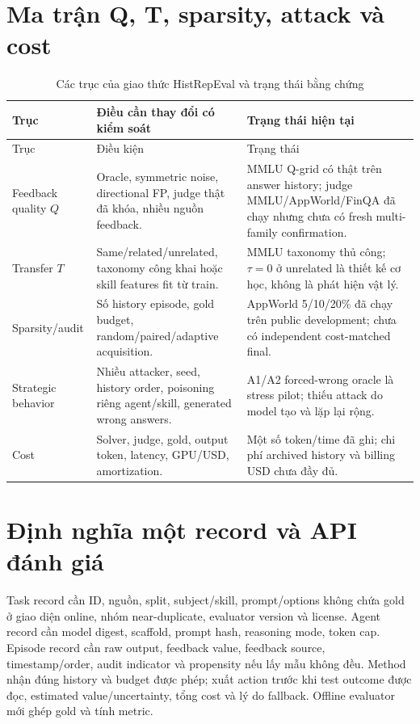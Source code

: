 \documentclass[11pt,a4paper,openany]{book}
\begin{document}
\section{Ma trận Q, T, sparsity, attack và cost}
\begin{longtable}{p{31mm}p{57mm}p{63mm}}\caption{Các trục của giao thức HistRepEval và trạng thái bằng chứng}\label{tab:histrepeval}\\\toprule Trục & Điều cần thay đổi có kiểm soát & Trạng thái hiện tại\\\midrule\endfirsthead\toprule Trục & Điều kiện & Trạng thái\\\midrule\endhead
Feedback quality \(Q\) & Oracle, symmetric noise, directional FP, judge thật đã khóa, nhiều nguồn feedback. & MMLU Q-grid có thật trên answer history; judge MMLU/AppWorld/FinQA đã chạy nhưng chưa có fresh multi-family confirmation.\\
Transfer \(T\) & Same/related/unrelated, taxonomy công khai hoặc skill features fit từ train. & MMLU taxonomy thủ công; \(\tau=0\) ở unrelated là thiết kế cơ học, không là phát hiện vật lý.\\
Sparsity/audit & Số history episode, gold budget, random/paired/adaptive acquisition. & AppWorld 5/10/20\% đã chạy trên public development; chưa có independent cost-matched final.\\
Strategic behavior & Nhiều attacker, seed, history order, poisoning riêng agent/skill, generated wrong answers. & A1/A2 forced-wrong oracle là stress pilot; thiếu attack do model tạo và lặp lại rộng.\\
Cost & Solver, judge, gold, output token, latency, GPU/USD, amortization. & Một số token/time đã ghi; chi phí archived history và billing USD chưa đầy đủ.\\\bottomrule\end{longtable}

\section{Định nghĩa một record và API đánh giá}
Task record cần ID, nguồn, split, subject/skill, prompt/options không chứa gold ở giao diện online, nhóm near-duplicate, evaluator version và license. Agent record cần model digest, scaffold, prompt hash, reasoning mode, token cap. Episode record cần raw output, feedback value, feedback source, timestamp/order, audit indicator và propensity nếu lấy mẫu không đều. Method nhận đúng history và budget được phép; xuất action trước khi test outcome được đọc, estimated value/uncertainty, tổng cost và lý do fallback. Offline evaluator mới ghép gold và tính metric.
\end{document}
